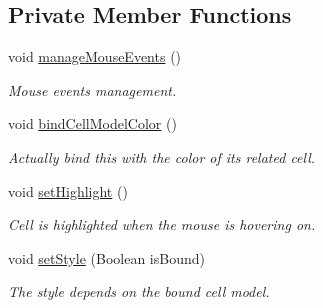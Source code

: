\subsection*{Private Member Functions}
\begin{DoxyCompactItemize}
\item 
void \hyperlink{classbattleship2D_1_1ui_1_1CellUI_aabf93a2e99692f4f89e49ded145d55e0}{manage\-Mouse\-Events} ()
\begin{DoxyCompactList}\small\item\em Mouse events management. \end{DoxyCompactList}\item 
void \hyperlink{classbattleship2D_1_1ui_1_1CellUI_a94efde670e08833d3cc1ee119c24588d}{bind\-Cell\-Model\-Color} ()
\begin{DoxyCompactList}\small\item\em Actually bind this with the color of its related cell. \end{DoxyCompactList}\item 
void \hyperlink{classbattleship2D_1_1ui_1_1CellUI_a8309e9cfa7ebb4b8c62254f152a24561}{set\-Highlight} ()
\begin{DoxyCompactList}\small\item\em Cell is highlighted when the mouse is hovering on. \end{DoxyCompactList}\item 
void \hyperlink{classbattleship2D_1_1ui_1_1CellUI_a58244e6fa1932bf6f427c73a515d524f}{set\-Style} (Boolean is\-Bound)
\begin{DoxyCompactList}\small\item\em The style depends on the bound cell model. \end{DoxyCompactList}\end{DoxyCompactItemize}
